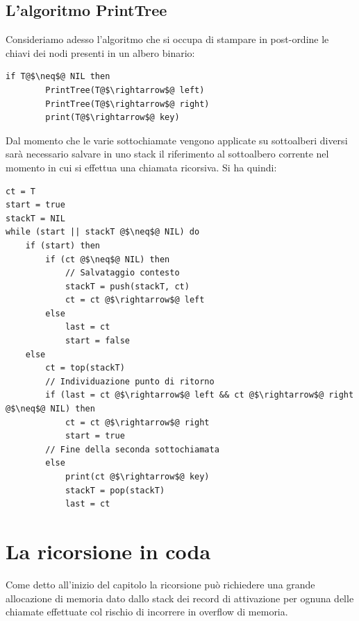 \subsection{L'algoritmo PrintTree}
Consideriamo adesso l'algoritmo che si occupa di stampare in post-ordine le chiavi dei nodi presenti in un albero binario:
\begin{lstlisting}[language=asd,label=lst:print_tree,caption={\textsc{PrintTree}(T)}]
	if T@$\neq$@ NIL then
		PrintTree(T@$\rightarrow$@ left)
		PrintTree(T@$\rightarrow$@ right)
		print(T@$\rightarrow$@ key)
\end{lstlisting}
Dal momento che le varie sottochiamate vengono applicate su sottoalberi diversi sarà necessario salvare in uno stack il riferimento al sottoalbero corrente nel momento in cui si effettua una chiamata ricorsiva. Si ha quindi:
\begin{lstlisting}[language=asd,caption={\textsc{PrintTree\_Iter}(T)}]
ct = T
start = true
stackT = NIL
while (start || stackT @$\neq$@ NIL) do
	if (start) then
		if (ct @$\neq$@ NIL) then
			// Salvataggio contesto
			stackT = push(stackT, ct)
			ct = ct @$\rightarrow$@ left
		else
			last = ct
			start = false
	else
		ct = top(stackT)
		// Individuazione punto di ritorno
		if (last = ct @$\rightarrow$@ left && ct @$\rightarrow$@ right @$\neq$@ NIL) then
			ct = ct @$\rightarrow$@ right
			start = true
		// Fine della seconda sottochiamata
		else
			print(ct @$\rightarrow$@ key)
			stackT = pop(stackT)
			last = ct
\end{lstlisting}
\section{La ricorsione in coda}
Come detto all'inizio del capitolo la ricorsione può richiedere una grande allocazione di memoria dato dallo stack dei record di attivazione per ognuna delle chiamate effettuate col rischio di incorrere in overflow di memoria.

